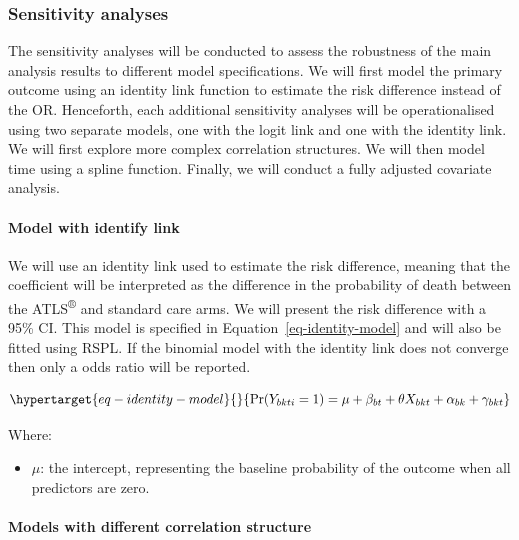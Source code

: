 \documentclass[
]{scrartcl}
\let\oldparagraph\paragraph
\renewcommand{\paragraph}[1]{\oldparagraph{#1}\mbox{}}
\providecommand{\tightlist}{%
  \setlength{\itemsep}{0pt}\setlength{\parskip}{0pt}}\usepackage{longtable,booktabs,array}
\begin{document}
\hypertarget{sensitivity-analyses}{%
\subsubsection{Sensitivity analyses}\label{sensitivity-analyses}}

The sensitivity analyses will be conducted to assess the robustness of
the main analysis results to different model specifications. We will
first model the primary outcome using an identity link function to
estimate the risk difference instead of the OR. Henceforth, each
additional sensitivity analyses will be operationalised using two
separate models, one with the logit link and one with the identity link.
We will first explore more complex correlation structures. We will then
model time using a spline function. Finally, we will conduct a fully
adjusted covariate analysis.

\hypertarget{model-with-identify-link}{%
\paragraph{Model with identify link}\label{model-with-identify-link}}

We will use an identity link used to estimate the risk difference,
meaning that the coefficient will be interpreted as the difference in
the probability of death between the ATLS\textsuperscript{®} and
standard care arms. We will present the risk difference with a 95\% CI.
This model is specified in Equation~\ref{eq-identity-model} and will
also be fitted using RSPL. If the binomial model with the identity link
does not converge then only a odds ratio will be reported.

\begin{equation}\protect\hypertarget{eq-identity-model}{}{
\text{Pr}(Y_{bkti} = 1) = \mu + \beta_{bt} + \theta X_{bkt} + \alpha_{bk} + \gamma_{bkt} 
}\label{eq-identity-model}\end{equation}

Where:

\begin{itemize}
\tightlist
\item
  \(\mu\): the intercept, representing the baseline probability of the
  outcome when all predictors are zero.
\end{itemize}

\hypertarget{models-with-different-correlation-structure}{%
\paragraph{Models with different correlation
structure}\label{models-with-different-correlation-structure}}
\end{document}
